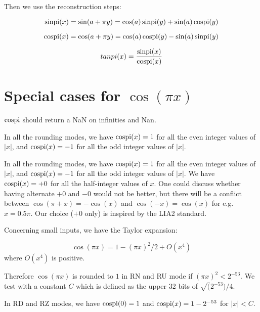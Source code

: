 Then we use the reconstruction steps:

\begin{equation}        
  \operatorname{sinpi}(x) = \sin(a + \pi y) =  \cos(a) \operatorname{sinpi}(y) +  \sin(a) \operatorname{cospi}(y) 
  \label{eq:sinpiapy}
\end{equation}

\begin{equation}
  \operatorname{cospi}(x) = \cos(a + \pi y) = \cos(a) \operatorname{cospi}(y) -  \sin(a) \operatorname{sinpi}(y) 
  \label{eq:cosapy}
\end{equation}

\begin{equation} 
  tanpi(x) = \frac{\operatorname{sinpi}(x)}{\operatorname{cospi}(x)} 
  \label{eq:tanapy}
\end{equation}



\section{Special cases for $\cos(\pi x)$ }

$\operatorname{cospi}$ should return a NaN on infinities and Nan.

In all the rounding modes, we have $\operatorname{cospi}(x)=1$ for all the even integer
 values of $|x|$, and $\operatorname{cospi}(x)=-1$ for all the odd integer values of
 $|x|$.


 In all the rounding modes, we have $\operatorname{cospi}(x)=1$ for all the even
 integer values of $|x|$, and $\operatorname{cospi}(x)=-1$ for all the odd integer
 values of $|x|$. We have $\operatorname{cospi}(x)=+0$ for all the half-integer
 values of $x$. One could discuss whether having alternate $+0$ and
 $-0$ would not be better, but there will be a conflict between
 $\cos(\pi+x)=-\cos(x)$ and $\cos(-x)=\cos(x)$ for e.g. $x=0.5\pi$.
 Our choice ($+0$ only) is inspired by the LIA2 standard.


 Concerning small inputs, we have the Taylor expansion:

  \begin{equation}
    \cos(\pi x) = 1-(\pi x)^2/2 + O(x^4)\label{eq:cospiTaylor}
  \end{equation}
 where $O(x^4)$ is positive.

 Therefore $\cos(\pi x)$ is rounded to $1$ in RN and RU mode if $(\pi
 x)^2<{2^{-53}}$. We test with a constant $C$ which is defined as the
 upper 32 bits of  $\sqrt(2^{-53})/4$.

 In RD and RZ modes, we have $\operatorname{cospi}(0)=1$ and $\operatorname{cospi}(x)=1-2^{-53}$
 for $|x|<C$. 





